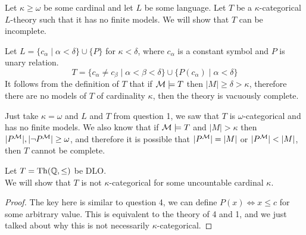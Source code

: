 \question{}
Let $\kappa \ge \omega$ be some cardinal and let $L$ be some language.
Let $T$ be a $\kappa$-categorical $L$-theory such that it has no finite models.
We will show that $T$ can be incomplete.
\begin{solution}
	Let $L = \{ c_{\alpha} \mid \alpha < \delta \} \cup \{ P \}$ for $\kappa < \delta$, where $c_{\alpha}$ is a constant symbol and $P$ is unary relation.
	\[
		T = \{ c_{\alpha} \ne c_{\beta} \mid \alpha < \beta < \delta \} \cup \{ P(c_{\alpha}) \mid \alpha < \delta \}
	\]
	It follows from the definition of $T$ that if $\mathcal{M} \models T$ then $|M| \ge \delta > \kappa$, therefore there are no models of $T$ of cardinality $\kappa$, then the theory is vacuously complete.

	Just take $\kappa = \omega$ and $L$ and $T$ from question 1, we saw that $T$ is $\omega$-categorical and has no finite models.
	We also know that if $\mathcal{M} \models T$ and $|M| > \kappa$ then $|P^{\mathcal{M}}|, |\lnot P^{\mathcal{M}}| \ge \omega$, and therefore it is possible that $|P^{\mathcal{M}}| = |M|$ or $|P^{\mathcal{M}}| < |M|$, then $T$ cannot be complete.
\end{solution}

\question{}
Let $T = \operatorname{Th}(\mathbb{Q}, \le)$ be DLO\@. \\
We will show that $T$ is not $\kappa$-categorical for some uncountable cardinal $\kappa$.
\begin{proof}
	The key here is similar to question 4, we can define $P(x) \iff x \le c$ for some arbitrary value.
	This is equivalent to the theory of 4 and 1, and we just talked about why this is not necessarily $\kappa$-categorical.
\end{proof}


